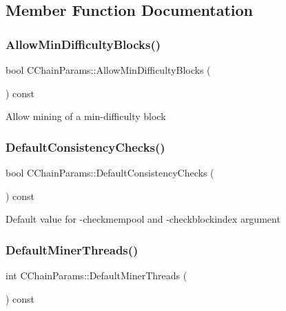 \subsection{Member Function Documentation}
\mbox{\label{class_c_chain_params_ac1202f87305ff3fdd4e1da28f1b35218}} 
\subsubsection{\texorpdfstring{AllowMinDifficultyBlocks()}{AllowMinDifficultyBlocks()}}
{\footnotesize\ttfamily bool C\+Chain\+Params\+::\+Allow\+Min\+Difficulty\+Blocks (\begin{DoxyParamCaption}{ }\end{DoxyParamCaption}) const\hspace{0.3cm}{\ttfamily [inline]}}

Allow mining of a min-\/difficulty block \mbox{\label{class_c_chain_params_a1d12f9b4b1ea7d7a0416cb6045496342}} 
\subsubsection{\texorpdfstring{DefaultConsistencyChecks()}{DefaultConsistencyChecks()}}
{\footnotesize\ttfamily bool C\+Chain\+Params\+::\+Default\+Consistency\+Checks (\begin{DoxyParamCaption}{ }\end{DoxyParamCaption}) const\hspace{0.3cm}{\ttfamily [inline]}}

Default value for -\/checkmempool and -\/checkblockindex argument \mbox{\label{class_c_chain_params_ac2da912493292c2139ca7753dde96b2e}} 
\subsubsection{\texorpdfstring{DefaultMinerThreads()}{DefaultMinerThreads()}}
{\footnotesize\ttfamily int C\+Chain\+Params\+::\+Default\+Miner\+Threads (\begin{DoxyParamCaption}{ }\end{DoxyParamCaption}) const\hspace{0.3cm}{\ttfamily [inline]}}

